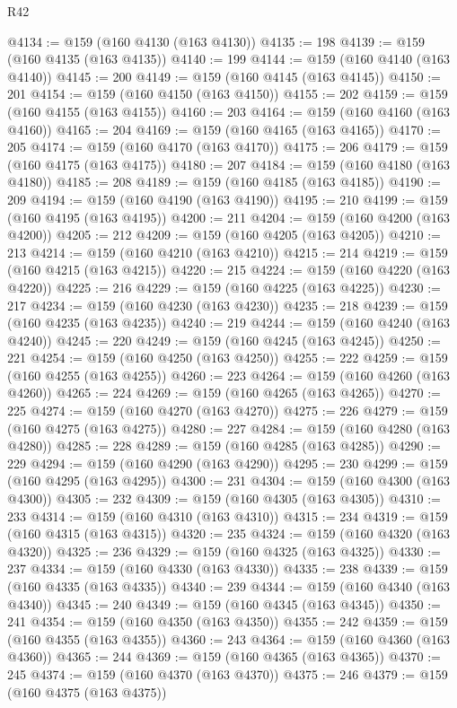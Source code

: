 \begin{lexlean}{R42}
\begin{coremodule}
@4134 := @159 (@160 @4130 (@163 @4130))
@4135 := 198
@4139 := @159 (@160 @4135 (@163 @4135))
@4140 := 199
@4144 := @159 (@160 @4140 (@163 @4140))
@4145 := 200
@4149 := @159 (@160 @4145 (@163 @4145))
@4150 := 201
@4154 := @159 (@160 @4150 (@163 @4150))
@4155 := 202
@4159 := @159 (@160 @4155 (@163 @4155))
@4160 := 203
@4164 := @159 (@160 @4160 (@163 @4160))
@4165 := 204
@4169 := @159 (@160 @4165 (@163 @4165))
@4170 := 205
@4174 := @159 (@160 @4170 (@163 @4170))
@4175 := 206
@4179 := @159 (@160 @4175 (@163 @4175))
@4180 := 207
@4184 := @159 (@160 @4180 (@163 @4180))
@4185 := 208
@4189 := @159 (@160 @4185 (@163 @4185))
@4190 := 209
@4194 := @159 (@160 @4190 (@163 @4190))
@4195 := 210
@4199 := @159 (@160 @4195 (@163 @4195))
@4200 := 211
@4204 := @159 (@160 @4200 (@163 @4200))
@4205 := 212
@4209 := @159 (@160 @4205 (@163 @4205))
@4210 := 213
@4214 := @159 (@160 @4210 (@163 @4210))
@4215 := 214
@4219 := @159 (@160 @4215 (@163 @4215))
@4220 := 215
@4224 := @159 (@160 @4220 (@163 @4220))
@4225 := 216
@4229 := @159 (@160 @4225 (@163 @4225))
@4230 := 217
@4234 := @159 (@160 @4230 (@163 @4230))
@4235 := 218
@4239 := @159 (@160 @4235 (@163 @4235))
@4240 := 219
@4244 := @159 (@160 @4240 (@163 @4240))
@4245 := 220
@4249 := @159 (@160 @4245 (@163 @4245))
@4250 := 221
@4254 := @159 (@160 @4250 (@163 @4250))
@4255 := 222
@4259 := @159 (@160 @4255 (@163 @4255))
@4260 := 223
@4264 := @159 (@160 @4260 (@163 @4260))
@4265 := 224
@4269 := @159 (@160 @4265 (@163 @4265))
@4270 := 225
@4274 := @159 (@160 @4270 (@163 @4270))
@4275 := 226
@4279 := @159 (@160 @4275 (@163 @4275))
@4280 := 227
@4284 := @159 (@160 @4280 (@163 @4280))
@4285 := 228
@4289 := @159 (@160 @4285 (@163 @4285))
@4290 := 229
@4294 := @159 (@160 @4290 (@163 @4290))
@4295 := 230
@4299 := @159 (@160 @4295 (@163 @4295))
@4300 := 231
@4304 := @159 (@160 @4300 (@163 @4300))
@4305 := 232
@4309 := @159 (@160 @4305 (@163 @4305))
@4310 := 233
@4314 := @159 (@160 @4310 (@163 @4310))
@4315 := 234
@4319 := @159 (@160 @4315 (@163 @4315))
@4320 := 235
@4324 := @159 (@160 @4320 (@163 @4320))
@4325 := 236
@4329 := @159 (@160 @4325 (@163 @4325))
@4330 := 237
@4334 := @159 (@160 @4330 (@163 @4330))
@4335 := 238
@4339 := @159 (@160 @4335 (@163 @4335))
@4340 := 239
@4344 := @159 (@160 @4340 (@163 @4340))
@4345 := 240
@4349 := @159 (@160 @4345 (@163 @4345))
@4350 := 241
@4354 := @159 (@160 @4350 (@163 @4350))
@4355 := 242
@4359 := @159 (@160 @4355 (@163 @4355))
@4360 := 243
@4364 := @159 (@160 @4360 (@163 @4360))
@4365 := 244
@4369 := @159 (@160 @4365 (@163 @4365))
@4370 := 245
@4374 := @159 (@160 @4370 (@163 @4370))
@4375 := 246
@4379 := @159 (@160 @4375 (@163 @4375))

\end{coremodule}
\end{lexlean}
